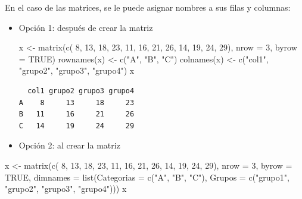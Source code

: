 \documentclass[
]{book}
\newenvironment{Shaded}{\begin{snugshade}}{\end{snugshade}}
\newcommand{\AttributeTok}[1]{\textcolor[rgb]{0.77,0.63,0.00}{#1}}
\newcommand{\ConstantTok}[1]{\textcolor[rgb]{0.00,0.00,0.00}{#1}}
\newcommand{\DecValTok}[1]{\textcolor[rgb]{0.00,0.00,0.81}{#1}}
\newcommand{\FunctionTok}[1]{\textcolor[rgb]{0.00,0.00,0.00}{#1}}
\newcommand{\NormalTok}[1]{#1}
\newcommand{\OtherTok}[1]{\textcolor[rgb]{0.56,0.35,0.01}{#1}}
\newcommand{\StringTok}[1]{\textcolor[rgb]{0.31,0.60,0.02}{#1}}
\begin{document}
En el caso de las matrices, se le puede asignar nombres a sus filas y columnas:

\begin{itemize}
\item
  Opción 1: después de crear la matriz

\begin{Shaded}
\begin{Highlighting}[]
\NormalTok{x }\OtherTok{\textless{}{-}} \FunctionTok{matrix}\NormalTok{(}\FunctionTok{c}\NormalTok{( }\DecValTok{8}\NormalTok{, }\DecValTok{13}\NormalTok{, }\DecValTok{18}\NormalTok{, }\DecValTok{23}\NormalTok{, }
              \DecValTok{11}\NormalTok{, }\DecValTok{16}\NormalTok{, }\DecValTok{21}\NormalTok{, }\DecValTok{26}\NormalTok{, }
              \DecValTok{14}\NormalTok{, }\DecValTok{19}\NormalTok{, }\DecValTok{24}\NormalTok{, }\DecValTok{29}\NormalTok{), }
              \AttributeTok{nrow =} \DecValTok{3}\NormalTok{, }\AttributeTok{byrow =} \ConstantTok{TRUE}\NormalTok{)}
\FunctionTok{rownames}\NormalTok{(x) }\OtherTok{\textless{}{-}} \FunctionTok{c}\NormalTok{(}\StringTok{"A"}\NormalTok{, }\StringTok{"B"}\NormalTok{, }\StringTok{"C"}\NormalTok{)}
\FunctionTok{colnames}\NormalTok{(x) }\OtherTok{\textless{}{-}} \FunctionTok{c}\NormalTok{(}\StringTok{"col1"}\NormalTok{, }\StringTok{"grupo2"}\NormalTok{, }\StringTok{"grupo3"}\NormalTok{, }\StringTok{"grupo4"}\NormalTok{)}
\NormalTok{x}
\end{Highlighting}
\end{Shaded}

\begin{verbatim}
  col1 grupo2 grupo3 grupo4
A    8     13     18     23
B   11     16     21     26
C   14     19     24     29
\end{verbatim}
\item
  Opción 2: al crear la matriz
\end{itemize}

\begin{Shaded}
\begin{Highlighting}[]
\NormalTok{x }\OtherTok{\textless{}{-}} \FunctionTok{matrix}\NormalTok{(}\FunctionTok{c}\NormalTok{( }\DecValTok{8}\NormalTok{, }\DecValTok{13}\NormalTok{, }\DecValTok{18}\NormalTok{, }\DecValTok{23}\NormalTok{, }
              \DecValTok{11}\NormalTok{, }\DecValTok{16}\NormalTok{, }\DecValTok{21}\NormalTok{, }\DecValTok{26}\NormalTok{, }
              \DecValTok{14}\NormalTok{, }\DecValTok{19}\NormalTok{, }\DecValTok{24}\NormalTok{, }\DecValTok{29}\NormalTok{), }
            \AttributeTok{nrow =} \DecValTok{3}\NormalTok{, }\AttributeTok{byrow =} \ConstantTok{TRUE}\NormalTok{,}
            \AttributeTok{dimnames =} \FunctionTok{list}\NormalTok{(}\AttributeTok{Categorias =} \FunctionTok{c}\NormalTok{(}\StringTok{"A"}\NormalTok{, }\StringTok{"B"}\NormalTok{, }\StringTok{"C"}\NormalTok{), }
                            \AttributeTok{Grupos =} \FunctionTok{c}\NormalTok{(}\StringTok{"grupo1"}\NormalTok{, }\StringTok{"grupo2"}\NormalTok{, }\StringTok{"grupo3"}\NormalTok{, }\StringTok{"grupo4"}\NormalTok{)))}
\NormalTok{x}
\end{Highlighting}
\end{Shaded}
\end{document}
